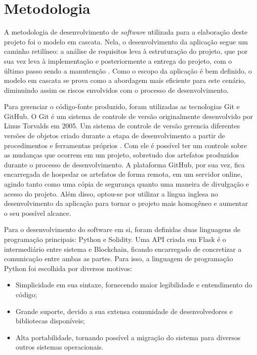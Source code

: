 \section{Metodologia}

A metodologia de desenvolvimento de \emph{software} utilizada para a elaboração deste projeto foi o modelo em cascata. Nela, o desenvolvimento da aplicação segue um caminho retilíneo: a análise de requisitos leva à estruturação do projeto, que por sua vez leva à implementação e posteriormente a entrega do projeto, com o último passo sendo a manutenção \cite{Pressman2021-jj}. Como o escopo da aplicação é bem definido, o modelo em cascata se prova como a abordagem mais eficiente para este cenário, diminuindo assim os riscos envolvidos com o processo de desenvolvimento.

Para gerenciar o código-fonte produzido, foram utilizadas as tecnologias Git e GitHub. O Git é um sistema de controle de versão originalmente desenvolvido por Linus Torvalds em 2005.  Um sistema de controle de versão gerencia diferentes versões de objetos criado durante a etapa de desenvolvimento a partir de procedimentos e ferramentas próprios \cite{Pressman2021-jj}. Com ele é possível ter um controle sobre as mudanças que ocorrem em um projeto, sobretudo dos artefatos produzidos durante o processo de desenvolvimento. A plataforma GitHub, por sua vez, fica encarregada de hospedar os artefatos de forma remota, em um servidor online, agindo tanto como uma cópia de segurança quanto uma maneira de divulgação e acesso do projeto. Além disso, optou-se por utilizar a língua inglesa no desenvolvimento da aplicação para tornar o projeto mais homogêneo e aumentar o seu possível alcance.

Para o desenvolvimento do software em si, foram definidas duas linguagens de programação principais: Python e Solidity. Uma API criada em Flask é o intermediário entre sistema e Blockchain, ficando encarregado de concretizar a comunicação entre ambas as partes. Para isso, a linguagem de programação Python foi escolhida por diversos motivos: 
\begin{itemize}
    \item Simplicidade em sua sintaxe, fornecendo maior legibilidade e entendimento do código;
    \item Grande suporte, devido a sua extensa comunidade de desenvolvedores e bibliotecas disponíveis;
    \item Alta portabilidade, tornando possível a migração do sistema para diversos outros sistemas operacionais.
\end{itemize}

